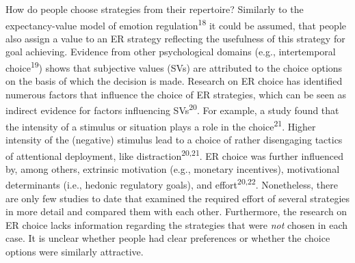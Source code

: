 \documentclass[
  english,
  man,floatsintext]{apa6}
\begin{document}
How do people choose strategies from their repertoire?
Similarly to the expectancy-value model of emotion regulation\textsuperscript{18} it could be assumed, that people also assign a value to an ER strategy reflecting the usefulness of this strategy for goal achieving.
Evidence from other psychological domains (e.g., intertemporal choice\textsuperscript{19}) shows that subjective values (SVs) are attributed to the choice options on the basis of which the decision is made.
Research on ER choice has identified numerous factors that influence the choice of ER strategies, which can be seen as indirect evidence for factors influencing SVs\textsuperscript{20}.
For example, a study found that the intensity of a stimulus or situation plays a role in the choice\textsuperscript{21}.
Higher intensity of the (negative) stimulus lead to a choice of rather disengaging tactics of attentional deployment, like distraction\textsuperscript{20,21}.
ER choice was further influenced by, among others, extrinsic motivation (e.g., monetary incentives), motivational determinants (i.e., hedonic regulatory goals), and effort\textsuperscript{20,22}.
Nonetheless, there are only few studies to date that examined the required effort of several strategies in more detail and compared them with each other.
Furthermore, the research on ER choice lacks information regarding the strategies that were \emph{not} chosen in each case.
It is unclear whether people had clear preferences or whether the choice options were similarly attractive.
\end{document}
